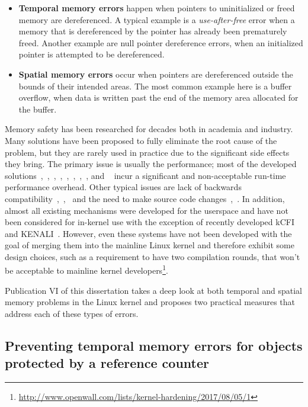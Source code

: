 \begin{itemize}
	\item \textbf{Temporal memory errors} happen when pointers to uninitialized or freed memory are dereferenced. A typical example is a \emph{use-after-free} error when a memory that is dereferenced by the pointer has already been prematurely freed. Another example are null pointer dereference errors, when an initialized pointer is attempted to be dereferenced. 
	\item \textbf{Spatial memory errors} occur when pointers are dereferenced outside the bounds of their intended areas. The most common example here is a buffer overflow, when data is written past the end of the memory area allocated for the buffer. 
\end{itemize}

Memory safety has been researched for decades both in academia and industry.
Many solutions have been proposed to fully eliminate the root cause of the problem, but they are rarely used in practice due to the significant side effects they bring. 
The primary issue is usually the performance; most of the developed solutions~\cite{hastings1991purify},~\cite{patil1995efficient},~\cite{patil1997low},~\cite{nagarakatte2009softbound},~\cite{jones1997backwards},~\cite{yong2003protecting},~\cite{xu2004efficient},~\cite{nethercote2004bounds}, and ~\cite{dhurjati2006backwards} incur a significant and non-acceptable run-time performance overhead.
Other typical issues are lack of backwards compatibility~\cite{necula2002ccured},~\cite{grossman2005cyclone},~\cite{austin1994efficient} and the need to make source code changes~\cite{necula2002ccured},~\cite{grossman2005cyclone}. 
In addition, almost all existing mechanisms were developed for the userspace and have not been considered for in-kernel use with the exception of recently developed kCFI~\cite{Rigo} and KENALI~\cite{kenali}. However, even these systems have not been developed with the goal of merging them into the mainline Linux kernel and therefore exhibit some design choices, such as a requirement to have two compilation rounds, that won't be acceptable to mainline kernel developers\footnote{\url{http://www.openwall.com/lists/kernel-hardening/2017/08/05/1}}. 

Publication VI of this dissertation takes a deep look at both temporal and spatial memory problems in the Linux kernel and proposes two practical measures that address each of these types of errors. 

\subsection{Preventing temporal memory errors for objects protected by a reference counter}
\label{sec:kern-mem-ref-count}

